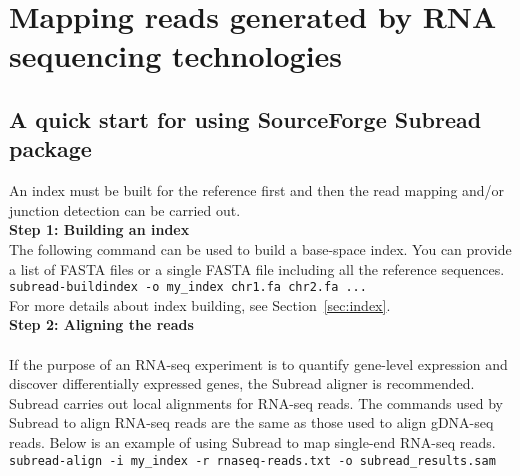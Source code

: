 \documentclass[12pt]{report}
\newcommand{\code}[1]{{\small\texttt{#1}}}
\newcommand{\Subread}{\textsf{Subread}}
\begin{document}
\newpage



\chapter{Mapping reads generated by RNA sequencing technologies}

\section{A quick start for using SourceForge {\Subread} package}

\label{sec:rnaseq-subread}
An index must be built for the reference first and then the read mapping and/or junction detection can be carried out.\\

{\noindent\bf Step 1: Building an index}\\

\noindent The following command can be used to build a base-space index.
You can provide a list of FASTA files or a single FASTA file including all the reference sequences.\\

\code{subread-buildindex -o my\_index chr1.fa chr2.fa ...}\\

\noindent For more details about index building, see Section~\ref{sec:index}.\\

{\noindent\bf Step 2: Aligning the reads}\\

\noindent{{\Subread}}\\

\noindent If the purpose of an RNA-seq experiment is to quantify gene-level expression and discover differentially expressed genes, the {\Subread} aligner is recommended.
{\Subread} carries out local alignments for RNA-seq reads.
The commands used by {\Subread} to align RNA-seq reads are the same as those used to align gDNA-seq reads.
Below is an example of using {\Subread} to map single-end RNA-seq reads.\\

\code{subread-align -i my\_index -r rnaseq-reads.txt -o subread\_results.sam}\\
\end{document}
